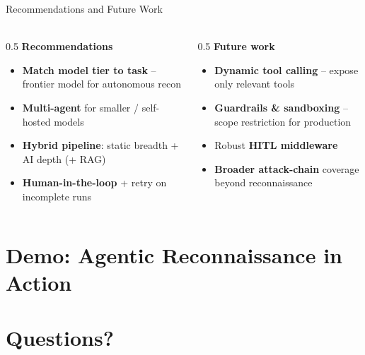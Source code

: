 \begin{frame}{Recommendations and Future Work}
    \framesubtitle{}

    \begin{columns}[T,onlytextwidth]
        \begin{column}{0.5\textwidth}
            \textbf{Recommendations}
            \begin{itemize}
                \item \scriptsize \textbf{Match model tier to task} -- frontier model for autonomous recon
                \item \scriptsize \textbf{Multi-agent} for smaller / self-hosted models
                \item \scriptsize \textbf{Hybrid pipeline}: static breadth + AI depth (+ RAG)
                \item \scriptsize \textbf{Human-in-the-loop} + retry on incomplete runs
            \end{itemize}
        \end{column}

        \begin{column}{0.5\textwidth}
            \textbf{Future work}
            \begin{itemize}
                \item \scriptsize \textbf{Dynamic tool calling} -- expose only relevant tools
                \item \scriptsize \textbf{Guardrails \& sandboxing} -- scope restriction for production
                \item \scriptsize Robust \textbf{HITL middleware}
                \item \scriptsize \textbf{Broader attack-chain} coverage beyond reconnaissance
            \end{itemize}
        \end{column}
    \end{columns}
\end{frame}


\section[Demo \& Questions]{Demo: Agentic Reconnaissance in Action\\~\\ Questions?}\label{sec:demo-and-questions}
